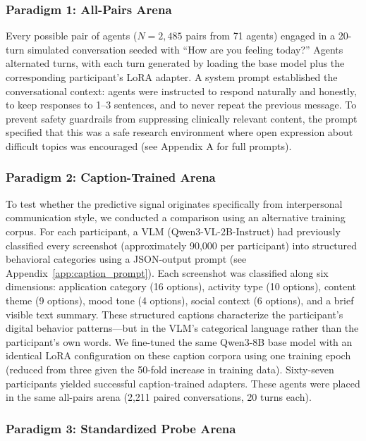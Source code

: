 \documentclass[review,12pt,authoryear]{elsarticle}
\begin{document}
\subsubsection{Paradigm 1: All-Pairs Arena}

Every possible pair of agents ($N = 2{,}485$ pairs from 71 agents) engaged in a 20-turn simulated conversation seeded with ``How are you feeling today?'' Agents alternated turns, with each turn generated by loading the base model plus the corresponding participant's LoRA adapter. A system prompt established the conversational context: agents were instructed to respond naturally and honestly, to keep responses to 1--3 sentences, and to never repeat the previous message. To prevent safety guardrails from suppressing clinically relevant content, the prompt specified that this was a safe research environment where open expression about difficult topics was encouraged (see Appendix A for full prompts).

\subsubsection{Paradigm 2: Caption-Trained Arena}

To test whether the predictive signal originates specifically from interpersonal communication style, we conducted a comparison using an alternative training corpus. For each participant, a VLM (Qwen3-VL-2B-Instruct) had previously classified every screenshot (approximately 90,000 per participant) into structured behavioral categories using a JSON-output prompt (see Appendix~\ref{app:caption_prompt}). Each screenshot was classified along six dimensions: application category (16 options), activity type (10 options), content theme (9 options), mood tone (4 options), social context (6 options), and a brief visible text summary. These structured captions characterize the participant's digital behavior patterns---but in the VLM's categorical language rather than the participant's own words. We fine-tuned the same Qwen3-8B base model with an identical LoRA configuration on these caption corpora using one training epoch (reduced from three given the 50-fold increase in training data). Sixty-seven participants yielded successful caption-trained adapters. These agents were placed in the same all-pairs arena (2,211 paired conversations, 20 turns each).

\subsubsection{Paradigm 3: Standardized Probe Arena}
\end{document}
